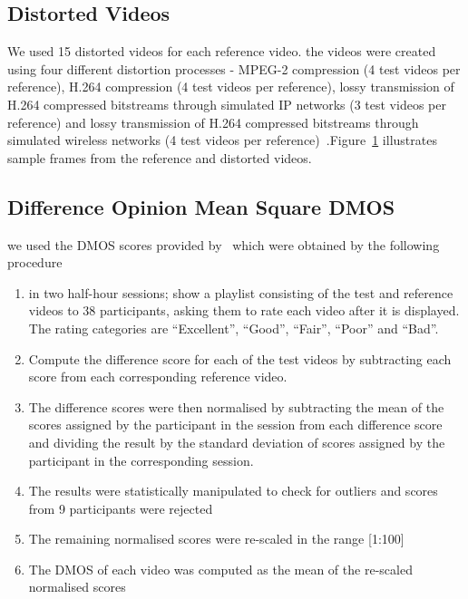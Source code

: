 \documentclass{article}
\begin{document}
\begin{figure}[h]
    \label{fig:frames}
\end{figure}

\subsection{Distorted Videos}
We used 15 distorted videos for each reference video. the videos were created using four different distortion processes - MPEG-2 compression (4 test videos per reference), H.264 compression (4 test videos per reference), lossy transmission of H.264 compressed bitstreams through simulated IP networks (3 test videos per reference) and lossy transmission of H.264 compressed bitstreams through simulated wireless networks (4 test
videos per reference)~\cite{kalp2010a,kalp2010b}.Figure~\ref{fig:frames} illustrates sample frames from the reference and distorted videos.
\subsection{Difference Opinion Mean Square DMOS}
we used the DMOS scores provided by~\cite{kalp2010a} which were obtained by the following procedure
\begin{enumerate}
    \item in two half-hour sessions; show a playlist consisting of the test and reference videos to 38 participants, asking them to rate each video after it is displayed. The rating categories are ``Excellent'', ``Good'', ``Fair'', ``Poor'' and ``Bad''.
    \item Compute the difference score for each of the test videos by subtracting each score from each corresponding reference video.
    \item The difference scores were then normalised by subtracting  the mean of the scores assigned by the participant in the session from each difference score and dividing the result by the standard deviation of scores assigned by the participant in the corresponding session.
    \item The results were statistically manipulated to check for outliers and scores from 9 participants were rejected
    \item The remaining normalised scores were re-scaled in the range [1:100]
    \item The DMOS of each video was computed as the mean of the re-scaled normalised scores
\end{enumerate}
\end{document}
